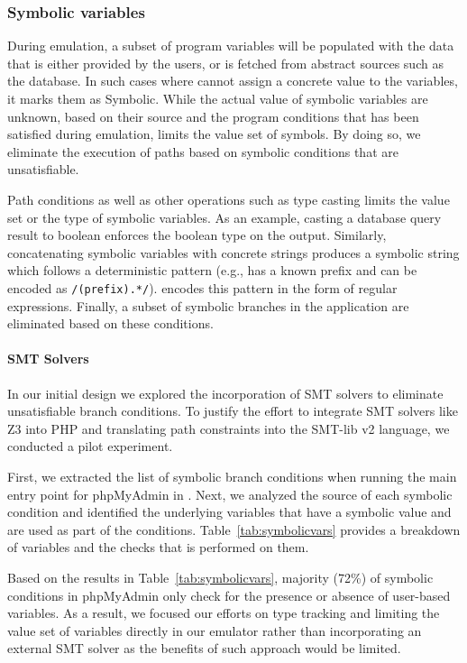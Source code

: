 \subsubsection{Symbolic variables}

During emulation, a subset of program variables will be populated with the data that is either provided by the users, or is fetched from abstract sources such as the database. 
In such cases where \animatedead{} cannot assign a concrete value to the variables, it marks them as Symbolic. 
While the actual value of symbolic variables are unknown, based on their source and the program conditions that has been satisfied during emulation, \animatedead{} limits the value set of symbols. 
By doing so, we eliminate the execution of paths based on symbolic conditions that are unsatisfiable.

Path conditions as well as other operations such as type casting limits the value set or the type of symbolic variables. 
As an example, casting a database query result to boolean enforces the boolean type on the output. 
Similarly, concatenating symbolic variables with concrete strings produces a symbolic string which follows a deterministic pattern (e.g., has a known prefix and can be encoded as \texttt{/(prefix).*/}). 
\animatedead{} encodes this pattern in the form of regular expressions. 
Finally, a subset of symbolic branches in the application are eliminated based on these conditions. 

\paragraph{SMT Solvers}
In our initial design we explored the incorporation of SMT solvers to eliminate unsatisfiable branch conditions. 
To justify the effort to integrate SMT solvers like Z3 into PHP and translating path constraints into the SMT-lib v2 language, we conducted a pilot experiment. 

First, we extracted the list of symbolic branch conditions when running the main entry point for phpMyAdmin in \animatedead{}. 
Next, we analyzed the source of each symbolic condition and identified the underlying variables that have a symbolic value and are used as part of the conditions. 
Table~\ref{tab:symbolicvars} provides a breakdown of variables and the checks that is performed on them. 

Based on the results in Table~\ref{tab:symbolicvars}, majority (72\%) of symbolic conditions in phpMyAdmin only check for the presence or absence of user-based variables. 
As a result, we focused our efforts on type tracking and limiting the value set of variables directly in our emulator rather than incorporating an external SMT solver as the benefits of such approach would be limited. 


